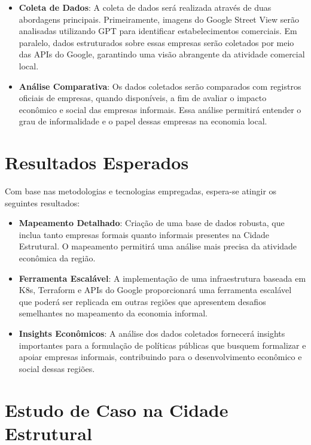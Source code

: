 \documentclass{article}
\begin{document}
\begin{itemize}
    \item \textbf{Coleta de Dados}: A coleta de dados será realizada através de duas abordagens principais. Primeiramente, imagens do Google Street View serão analisadas utilizando GPT para identificar estabelecimentos comerciais. Em paralelo, dados estruturados sobre essas empresas serão coletados por meio das APIs do Google, garantindo uma visão abrangente da atividade comercial local.
    
    \item \textbf{Análise Comparativa}: Os dados coletados serão comparados com registros oficiais de empresas, quando disponíveis, a fim de avaliar o impacto econômico e social das empresas informais. Essa análise permitirá entender o grau de informalidade e o papel dessas empresas na economia local.
\end{itemize}

\section*{Resultados Esperados}

Com base nas metodologias e tecnologias empregadas, espera-se atingir os seguintes resultados:

\begin{itemize}
    \item \textbf{Mapeamento Detalhado}: Criação de uma base de dados robusta, que inclua tanto empresas formais quanto informais presentes na Cidade Estrutural. O mapeamento permitirá uma análise mais precisa da atividade econômica da região.
    
    \item \textbf{Ferramenta Escalável}: A implementação de uma infraestrutura baseada em K8s, Terraform e APIs do Google proporcionará uma ferramenta escalável que poderá ser replicada em outras regiões que apresentem desafios semelhantes no mapeamento da economia informal.
    
    \item \textbf{Insights Econômicos}: A análise dos dados coletados fornecerá insights importantes para a formulação de políticas públicas que busquem formalizar e apoiar empresas informais, contribuindo para o desenvolvimento econômico e social dessas regiões.
\end{itemize}


\section*{Estudo de Caso na Cidade Estrutural}
\end{document}
